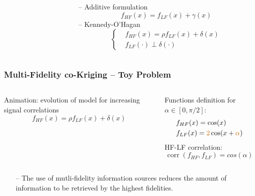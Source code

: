 \documentclass{beamer}
\theoremstyle{remark}
\theoremstyle{plain}
\begin{document}
\begin{frame}[fragile]
\begin{columns}
\begin{column}{0.45\linewidth}
{
}
\end{column}
\begin{column}{0.45\linewidth}
\scriptsize
-- Additive formulation \cite{VFM}
\begin{equation*}
f_{HF}(x) = f_{LF}(x) + \gamma(x)
\label{eq:vfm}
\end{equation*}
-- Kennedy-O'Hagan \cite{KeO}
\begin{equation*}
\left\{
\begin{array}{ll}
&f_{HF}(x) = \rho f_{LF}(x) + \delta(x)\\
&f_{LF}(\cdot) \perp \delta(\cdot)
\end{array}
\right.
\label{eq:mfk}
\end{equation*}
\end{column}
\end{columns}
\normalsize
{}
\end{frame}

\begin{frame}[fragile]
  \frametitle{Multi-Fidelity co-Kriging -- Toy Problem}
  \begin{columns}
    \begin{column}{0.6\linewidth}
  	\begin{center}
    \fontsize{7pt}{7pt}\selectfont Animation: evolution of model for increasing signal correlations
    \[f_{HF}(x) = \rho f_{LF}(x) + \delta(x)\]
 	\end{center}
  	\end{column}
    \begin{column}{0.4\linewidth}
    Functions definition for \(\alpha \in [0, \pi/2]\):
    \begin{align*}
		& f_{HF}(x) = \cos(x) \\
		& f_{LF}(x) = \textcolor{orange!80!black}{2} \cos(x+\textcolor{orange!80!black}{\alpha})
	\end{align*}
    HF-LF correlation:
    \[\operatorname{corr} (f_{HF},f_{LF}) = cos(\alpha)\]
    \end{column}
  \end{columns}
  \small
  \begin{itemize}
      \item[--]The use of mutli-fidelity information sources reduces the amount of information to be retrieved by the highest fidelities.
  \end{itemize}
\end{frame}
\end{document}

